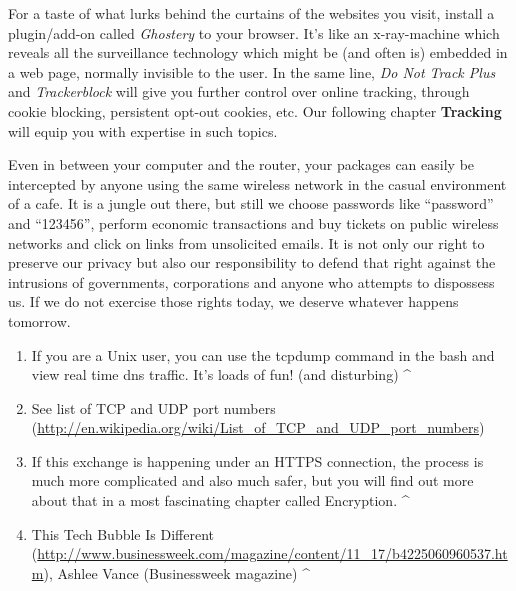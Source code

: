 For a taste of what lurks behind the curtains of the websites you visit,
install a plugin/add-on called \emph{Ghostery} to your browser. It's
like an x-ray-machine which reveals all the surveillance technology
which might be (and often is) embedded in a web page, normally invisible
to the user. In the same line, \emph{Do Not Track Plus} and
\emph{Trackerblock} will give you further control over online tracking,
through cookie blocking, persistent opt-out cookies, etc. Our following
chapter \textbf{Tracking} will equip you with expertise in such topics.

Even in between your computer and the router, your packages can easily
be intercepted by anyone using the same wireless network in the casual
environment of a cafe. It is a jungle out there, but still we choose
passwords like ``password'' and ``123456'', perform economic
transactions and buy tickets on public wireless networks and click on
links from unsolicited emails. It is not only our right to preserve our
privacy but also our responsibility to defend that right against the
intrusions of governments, corporations and anyone who attempts to
dispossess us. If we do not exercise those rights today, we deserve
whatever happens tomorrow.

\begin{enumerate}[1.]
\item
  If you are a Unix user, you can use the tcpdump command in the bash
  and view real time dns traffic. It's loads of fun! (and disturbing)
  \^{}
\item
  See list of TCP and UDP port numbers
  (\href{http://en.wikipedia.org/wiki/List\_of\_TCP\_and\_UDP\_port\_numbers}{http://en.wikipedia.org/wiki/List\_of\_TCP\_and\_UDP\_port\_numbers})
\item
  If this exchange is happening under an HTTPS connection, the process
  is much more complicated and also much safer, but you will find out
  more about that in a most fascinating chapter called Encryption. \^{}
\item
  This Tech Bubble Is Different
  (\href{http://www.businessweek.com/magazine/content/11\_17/b4225060960537.htm}{http://www.businessweek.com/magazine/content/11\_17/b4225060960537.htm}),
  Ashlee Vance (Businessweek magazine) \^{}
\end{enumerate}
